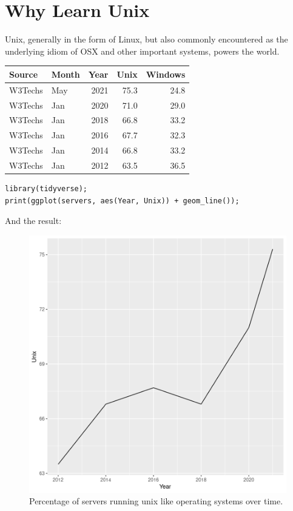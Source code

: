 \documentclass[11pt]{article}
\author{Vincent Toups}
\date{\today}
\title{}
\begin{document}
\tableofcontents

\section{Why Learn Unix}
\label{sec:org85e601e}

Unix, generally in the form of Linux, but also commonly encountered as
the underlying idiom of OSX and other important systems, powers the
world.

\begin{table}[htbp]
\label{tab:org0c517c8}
\centering
\begin{tabular}{llrrr}
Source & Month & Year & Unix & Windows\\
\hline
W3Techs & May & 2021 & 75.3 & 24.8\\
W3Techs & Jan & 2020 & 71.0 & 29.0\\
W3Techs & Jan & 2018 & 66.8 & 33.2\\
W3Techs & Jan & 2016 & 67.7 & 32.3\\
W3Techs & Jan & 2014 & 66.8 & 33.2\\
W3Techs & Jan & 2012 & 63.5 & 36.5\\
\end{tabular}
\end{table}

\begin{verbatim}
library(tidyverse);
print(ggplot(servers, aes(Year, Unix)) + geom_line());
\end{verbatim}

And the result: 

\begin{figure}[htbp]
\centering
\includegraphics[width=.9\linewidth]{./z.png}
\caption{\label{fig:orgedb295c}Percentage of servers running unix like operating systems over time.}
\end{figure}
\end{document}

